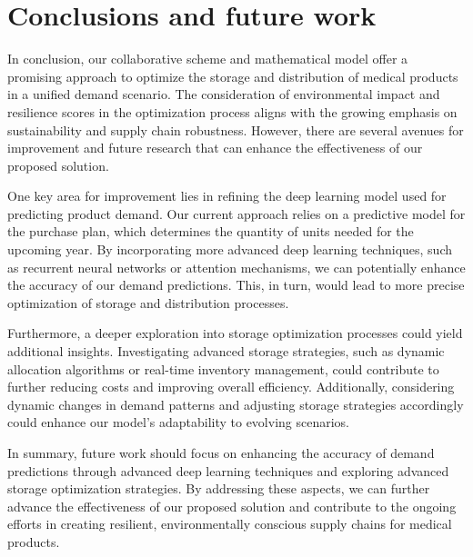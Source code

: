 \documentclass[11pt,twocolumn]{article}
\begin{document}
\section{Conclusions and future work}

In conclusion, our collaborative scheme and mathematical model offer a promising approach to optimize the storage and distribution of medical products in a unified demand scenario. The consideration of environmental impact and resilience scores in the optimization process aligns with the growing emphasis on sustainability and supply chain robustness. However, there are several avenues for improvement and future research that can enhance the effectiveness of our proposed solution.

One key area for improvement lies in refining the deep learning model used for predicting product demand. Our current approach relies on a predictive model for the purchase plan, which determines the quantity of units needed for the upcoming year. By incorporating more advanced deep learning techniques, such as recurrent neural networks or attention mechanisms, we can potentially enhance the accuracy of our demand predictions. This, in turn, would lead to more precise optimization of storage and distribution processes.

Furthermore, a deeper exploration into storage optimization processes could yield additional insights. Investigating advanced storage strategies, such as dynamic allocation algorithms or real-time inventory management, could contribute to further reducing costs and improving overall efficiency. Additionally, considering dynamic changes in demand patterns and adjusting storage strategies accordingly could enhance our model's adaptability to evolving scenarios.

In summary, future work should focus on enhancing the accuracy of demand predictions through advanced deep learning techniques and exploring advanced storage optimization strategies. By addressing these aspects, we can further advance the effectiveness of our proposed solution and contribute to the ongoing efforts in creating resilient, environmentally conscious supply chains for medical products.
\end{document}
